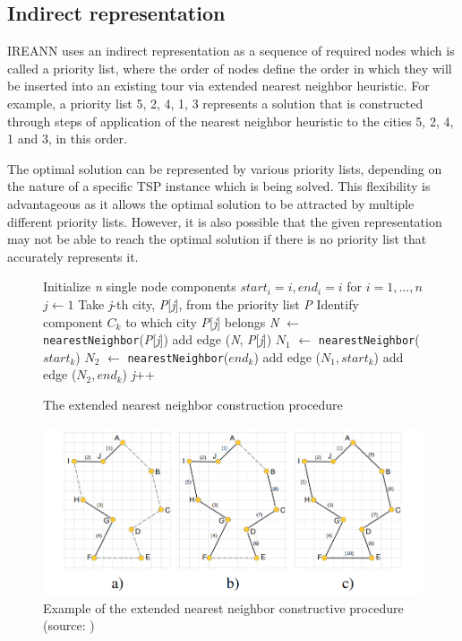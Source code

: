 \documentclass[twoside]{ctuthesis}
\theoremstyle{plain}
\theoremstyle{definition}
\theoremstyle{note}
\begin{document}
\subsection{Indirect representation}
IREANN uses an indirect representation as a sequence of required nodes which is called a priority list, where the order of nodes define the order in which they will be inserted into an existing tour via extended nearest neighbor heuristic. For example, a priority list {5, 2, 4, 1, 3} represents a solution that is constructed through steps of application of the nearest neighbor heuristic to the cities 5, 2, 4, 1 and 3, in this order.

The optimal solution can be represented by various priority lists, depending on the nature of a specific TSP instance which is being solved. This flexibility is advantageous as it allows the optimal solution to be attracted by multiple different priority lists. However, it is also possible that the given representation may not be able to reach the optimal solution if there is no priority list that accurately represents it.


\begin{figure}
\begin{algorithmic}[1]
\State Initialize \emph{n} single node components \emph{$ start_i = i, end_i = i $} for \emph{$ i = 1, ..., n $}
\State $j \gets 1$
\Do
\State Take \emph{j}-th city, \emph{P}[\emph{j}], from the priority list \emph{P}
\State Identify component \emph{$ C_k $} to which city \emph{P}[\emph{j}] belongs
\State \emph{N} $\gets$ {\tt nearestNeighbor}(\emph{P}[\emph{j}])
\State add edge (\emph{N}, \emph{P}[\emph{j}])
\Else
\State \emph{$ N_1 $} $\gets$ {\tt nearestNeighbor}(\emph{$ start_k $})
\State \emph{$ N_2 $} $\gets$ {\tt nearestNeighbor}(\emph{$ end_k $})
\State add edge (\emph{$ N_1, start_k $})
\Else
\State add edge (\emph{$ N_2, end_k $})
\EndIf
\EndIf
\State \emph{j}++

\end{algorithmic}
	\caption{The extended nearest neighbor construction procedure}
	\label{fig:cnnptsp}
\end{figure}

\begin{figure}
	\includegraphics[width=\linewidth]{tspexample.png}
	\caption{Example of the extended nearest neighbor constructive
		procedure (source: \cite{kubalik2014novel})}
	\label{fig:tsp}
\end{figure}
\end{document}
